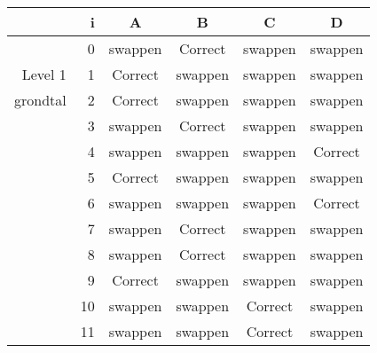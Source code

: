 \begin{tabular}{ rr| c|c|c|c}\hline\hline
     & i & \textbf{A} & \textbf{B} & \textbf{C} & \textbf{D}\\\hline

&0&swappen&Correct\cellcolor[gray]{0.6}&swappen&swappen\\
Level 1 & 1&Correct\cellcolor[gray]{0.6}&swappen&swappen&swappen\\
grondtal &2&Correct\cellcolor[gray]{0.6}&swappen&swappen&swappen\\
&3&swappen&Correct\cellcolor[gray]{0.6}&swappen&swappen\\
&4&swappen&swappen&swappen&Correct\cellcolor[gray]{0.6}\\
&5&Correct\cellcolor[gray]{0.6}&swappen&swappen&swappen\\
&6&swappen&swappen&swappen&Correct\cellcolor[gray]{0.6}\\
&7&swappen&Correct\cellcolor[gray]{0.6}&swappen&swappen\\
&8&swappen&Correct\cellcolor[gray]{0.6}&swappen&swappen\\
&9&Correct\cellcolor[gray]{0.6}&swappen&swappen&swappen\\
&10&swappen&swappen&Correct\cellcolor[gray]{0.6}&swappen\\
&11&swappen&swappen&Correct\cellcolor[gray]{0.6}&swappen\\
\hline\end{tabular}\par\ \newline

